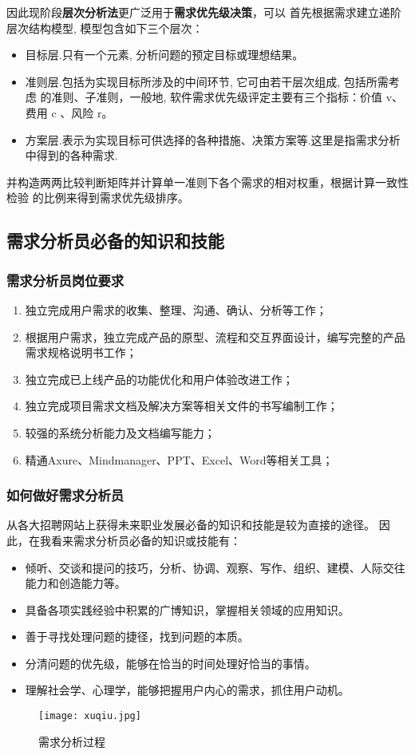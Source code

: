\documentclass[withoutpreface,bwprint]{cumcmthesis} %
\begin{document}
因此现阶段\textbf{层次分析法}更广泛用于\textbf{需求优先级决策}，可以
首先根据需求建立递阶层次结构模型, 模型包含如下三个层次：
\begin{itemize}
\item 目标层.只有一个元素, 分析问题的预定目标或理想结果。

\item 准则层.包括为实现目标所涉及的中间环节, 它可由若干层次组成, 包括所需考虑
的准则、子准则，一般地, 软件需求优先级评定主要有三个指标：价值 v、费用 c 、风险 r。

\item 方案层.表示为实现目标可供选择的各种措施、决策方案等.这里是指需求分析中得到的各种需求.
\end{itemize}

并构造两两比较判断矩阵并计算单一准则下各个需求的相对权重，根据计算一致性检验
的比例来得到需求优先级排序。

\subsection{需求分析员必备的知识和技能}

\subsubsection{需求分析员岗位要求}
\begin{enumerate}
\item 独立完成用户需求的收集、整理、沟通、确认、分析等工作；
\item 根据用户需求，独立完成产品的原型、流程和交互界面设计，编写完整的产品需求规格说明书工作；
\item 独立完成已上线产品的功能优化和用户体验改进工作；
\item 独立完成项目需求文档及解决方案等相关文件的书写编制工作；
\item 较强的系统分析能力及文档编写能力；
\item 精通Axure、Mindmanager、PPT、Excel、Word等相关工具；
\end{enumerate}

\subsubsection{如何做好需求分析员}
从各大招聘网站上获得未来职业发展必备的知识和技能是较为直接的途径。
因此，在我看来需求分析员必备的知识或技能有：
\begin{itemize}
    \item 倾听、交谈和提问的技巧，分析、协调、观察、写作、组织、建模、人际交往能力和创造能力等。
    \item 具备各项实践经验中积累的广博知识，掌握相关领域的应用知识。
    \item 善于寻找处理问题的捷径，找到问题的本质。
    \item 分清问题的优先级，能够在恰当的时间处理好恰当的事情。
    \item 理解社会学、心理学，能够把握用户内心的需求，抓住用户动机。
\end{itemize}
\begin{figure}[H]
	\centering
	\texttt{[image: xuqiu.jpg]}
	\caption{ 需求分析过程 \label{fig:1}}
\end{figure}
\end{document}
